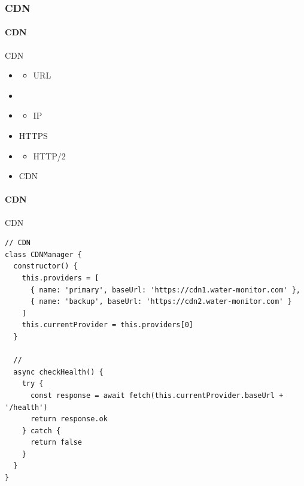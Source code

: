 \hypertarget{cdn-3}{%
\subsubsection{CDN}\label{cdn-3}}

\hypertarget{cdn-4}{%
\paragraph{CDN}\label{cdn-4}}

CDN


\begin{itemize}
\item
  \begin{itemize}
  \tightlist
  \item
    URL
  \end{itemize}
\item
\item
  \begin{itemize}
  \tightlist
  \item
    IP
  \end{itemize}
\item
  HTTPS
\end{itemize}


\begin{itemize}
\item
  \begin{itemize}
  \tightlist
  \item
    HTTP/2
  \end{itemize}
\item
  CDN
\end{itemize}

\hypertarget{cdn-5}{%
\paragraph{CDN}\label{cdn-5}}

CDN

\begin{lstlisting}[style=javascript]
// CDN
class CDNManager {
  constructor() {
    this.providers = [
      { name: 'primary', baseUrl: 'https://cdn1.water-monitor.com' },
      { name: 'backup', baseUrl: 'https://cdn2.water-monitor.com' }
    ]
    this.currentProvider = this.providers[0]
  }
  
  // 
  async checkHealth() {
    try {
      const response = await fetch(this.currentProvider.baseUrl + '/health')
      return response.ok
    } catch {
      return false
    }
  }
}
\end{lstlisting}

